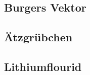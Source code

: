    \subsection{Burgers Vektor}
            
    \subsection{Ätzgrübchen}

    \subsection{Lithiumflourid}